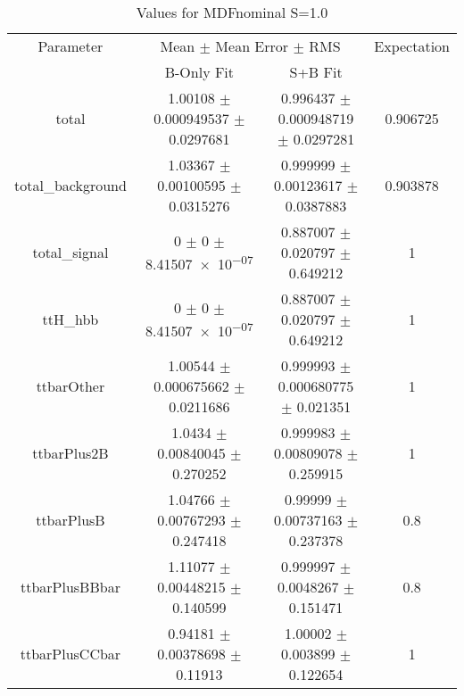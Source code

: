 \begin{table}
\centering
\caption{Values for MDFnominal S=1.0}
\begin{tabular}{cccc}
\toprule
Parameter & \multicolumn{2}{c}{Mean $\pm$ Mean Error $\pm$ RMS} & Expectation\\
 & B-Only Fit & S+B Fit & \\
\midrule
total & \num{1.00108} $\pm$ \num{0.000949537} $\pm$ \num{0.0297681} & \num{0.996437} $\pm$ \num{0.000948719} $\pm$ \num{0.0297281} & \num{0.906725}\\
total\_background & \num{1.03367} $\pm$ \num{0.00100595} $\pm$ \num{0.0315276} & \num{0.999999} $\pm$ \num{0.00123617} $\pm$ \num{0.0387883} & \num{0.903878}\\
total\_signal & \num{0} $\pm$ \num{0} $\pm$ \num{8.41507e-07} & \num{0.887007} $\pm$ \num{0.020797} $\pm$ \num{0.649212} & \num{1}\\
ttH\_hbb & \num{0} $\pm$ \num{0} $\pm$ \num{8.41507e-07} & \num{0.887007} $\pm$ \num{0.020797} $\pm$ \num{0.649212} & \num{1}\\
ttbarOther & \num{1.00544} $\pm$ \num{0.000675662} $\pm$ \num{0.0211686} & \num{0.999993} $\pm$ \num{0.000680775} $\pm$ \num{0.021351} & \num{1}\\
ttbarPlus2B & \num{1.0434} $\pm$ \num{0.00840045} $\pm$ \num{0.270252} & \num{0.999983} $\pm$ \num{0.00809078} $\pm$ \num{0.259915} & \num{1}\\
ttbarPlusB & \num{1.04766} $\pm$ \num{0.00767293} $\pm$ \num{0.247418} & \num{0.99999} $\pm$ \num{0.00737163} $\pm$ \num{0.237378} & \num{0.8}\\
ttbarPlusBBbar & \num{1.11077} $\pm$ \num{0.00448215} $\pm$ \num{0.140599} & \num{0.999997} $\pm$ \num{0.0048267} $\pm$ \num{0.151471} & \num{0.8}\\
ttbarPlusCCbar & \num{0.94181} $\pm$ \num{0.00378698} $\pm$ \num{0.11913} & \num{1.00002} $\pm$ \num{0.003899} $\pm$ \num{0.122654} & \num{1}\\
\bottomrule
\end{tabular}
\end{table}